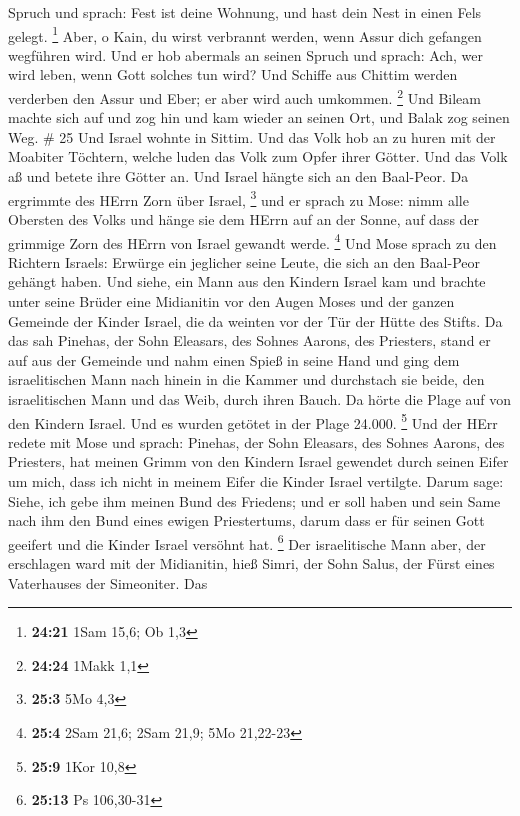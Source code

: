 Spruch und sprach: Fest ist deine Wohnung, und hast dein Nest in einen
Fels gelegt. \footnote{\textbf{24:21} 1Sam 15,6; Ob 1,3} 
Aber, o Kain, du wirst verbrannt werden, wenn Assur dich gefangen
wegführen wird.  Und er hob abermals an seinen Spruch und
sprach: Ach, wer wird leben, wenn Gott solches tun wird? 
Und Schiffe aus Chittim werden verderben den Assur und Eber; er aber
wird auch umkommen. \footnote{\textbf{24:24} 1Makk 1,1} 
Und Bileam machte sich auf und zog hin und kam wieder an seinen Ort, und
Balak zog seinen Weg. \# 25  Und Israel wohnte in Sittim.
Und das Volk hob an zu huren mit der Moabiter Töchtern, 
welche luden das Volk zum Opfer ihrer Götter. Und das Volk aß und betete
ihre Götter an.  Und Israel hängte sich an den Baal-Peor. Da
ergrimmte des HErrn Zorn über Israel, \footnote{\textbf{25:3} 5Mo 4,3}
 und er sprach zu Mose: nimm alle Obersten des Volks und
hänge sie dem HErrn auf an der Sonne, auf dass der grimmige Zorn des
HErrn von Israel gewandt werde. \footnote{\textbf{25:4} 2Sam 21,6; 2Sam
  21,9; 5Mo 21,22-23}  Und Mose sprach zu den Richtern
Israels: Erwürge ein jeglicher seine Leute, die sich an den Baal-Peor
gehängt haben.  Und siehe, ein Mann aus den Kindern Israel
kam und brachte unter seine Brüder eine Midianitin vor den Augen Moses
und der ganzen Gemeinde der Kinder Israel, die da weinten vor der Tür
der Hütte des Stifts.  Da das sah Pinehas, der Sohn
Eleasars, des Sohnes Aarons, des Priesters, stand er auf aus der
Gemeinde und nahm einen Spieß in seine Hand  und ging dem
israelitischen Mann nach hinein in die Kammer und durchstach sie beide,
den israelitischen Mann und das Weib, durch ihren Bauch. Da hörte die
Plage auf von den Kindern Israel.  Und es wurden getötet in
der Plage 24.000. \footnote{\textbf{25:9} 1Kor 10,8}  Und
der HErr redete mit Mose und sprach:  Pinehas, der Sohn
Eleasars, des Sohnes Aarons, des Priesters, hat meinen Grimm von den
Kindern Israel gewendet durch seinen Eifer um mich, dass ich nicht in
meinem Eifer die Kinder Israel vertilgte.  Darum sage:
Siehe, ich gebe ihm meinen Bund des Friedens;  und er soll
haben und sein Same nach ihm den Bund eines ewigen Priestertums, darum
dass er für seinen Gott geeifert und die Kinder Israel versöhnt hat.
\footnote{\textbf{25:13} Ps 106,30-31}  Der israelitische
Mann aber, der erschlagen ward mit der Midianitin, hieß Simri, der Sohn
Salus, der Fürst eines Vaterhauses der Simeoniter.  Das
